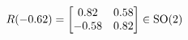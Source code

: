 \documentclass[preview]{standalone}
\begin{document}
\begin{align*}
\special{dvisvgm:raw <g id='unique000'>}R(-0.62) = \begin{bmatrix} 0.82 & 0.58 \\ -0.58 & 0.82 \end{bmatrix} \in \text{SO}(2)\special{dvisvgm:raw </g>}
\end{align*}
\end{document}

